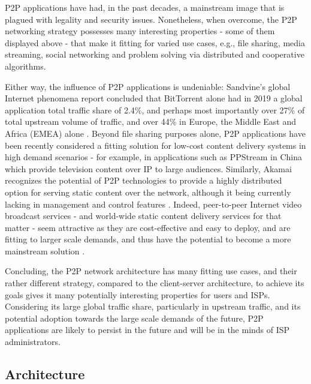     P2P applications have had, in the past decades, a mainstream image that is plagued with legality and security issues.
    Nonetheless, when overcome, the P2P networking strategy possesses many interesting properties - some of them displayed above - that make it fitting for varied use cases, e.g., file sharing, media streaming, social networking and problem solving via distributed and cooperative algorithms.

    Either way, the influence of P2P applications is undeniable: Sandvine's global Internet phenomena report concluded that BitTorrent alone had in 2019 a global application total traffic share of 2.4\%, and perhaps most importantly over 27\% of total upstream volume of traffic, and over 44\% in Europe, the Middle East and Africa (EMEA) alone \cite{sandvine2019}.
    Beyond file sharing purposes alone, P2P applications have been recently considered a fitting solution for low-cost content delivery systems in high demand scenarios - for example,  in applications such as PPStream in China which provide television content over IP to large audiences.
    Similarly, Akamai recognizes the potential of P2P technologies to provide a highly distributed option for serving static content over the network, although it being currently lacking in management and control features \cite{akamai-report}.
    Indeed, peer-to-peer Internet video broadcast services - and world-wide static content delivery services for that matter - seem attractive as they are cost-effective and easy to deploy, and are fitting to larger scale demands, and thus have the potential to become a more mainstream solution \cite{jianchuanliu2008}.

    Concluding, the P2P network architecture has many fitting use cases, and their rather different strategy, compared to the client-server architecture, to achieve its goals gives it many potentially interesting properties for users and ISPs.
    Considering its large global traffic share, particularly in upstream traffic, and its potential adoption towards the large scale demands of the future, P2P applications are likely to persist in the future and will be in the minds of ISP administrators.

\subsection{Architecture}

